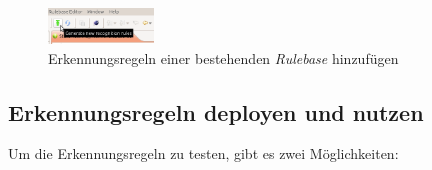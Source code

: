 \documentclass[a4paper]{scrartcl}
\begin{document}
\begin{figure}[H]
\centering
\includegraphics[width=0.25\textwidth]{graphics/silift-generate_new_recognition_rules.png}
\caption{Erkennungsregeln einer bestehenden \textit{Rulebase} hinzufügen}
\label{silift_generate_new_recognition_rules}
\end{figure}


\subsection{Erkennungsregeln deployen und nutzen}
\label{sec:deploying_recognitionrules}

Um die Erkennungsregeln zu testen, gibt es zwei Möglichkeiten:
\end{document}
